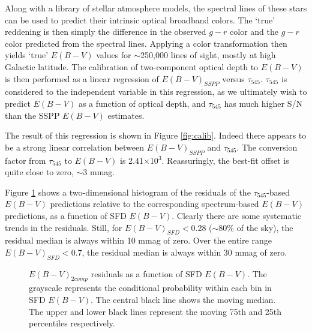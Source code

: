 \documentclass{emulateapj}
\begin{document}
Along with a library of stellar atmosphere models, the spectral lines of these
stars can be used to predict their intrinsic optical broadband colors. The 
`true' reddening is then simply the difference in the observed $g-r$ color and
the $g-r$ color predicted from the spectral lines. Applying a 
color transformation then yields `true' $E(B-V)$ values for $\sim$250,000 lines
of sight, mostly at high Galactic latitude. The calibration of two-component 
optical depth to $E(B-V)$ is then performed as a linear regression of 
$E(B-V)_{SSPP}$ versus $\tau_{545}$. $\tau_{545}$ is considered to the 
independent variable in this regression, as we ultimately wish to predict 
$E(B-V)$ as a function of optical depth, and $\tau_{545}$ has much higher S/N 
than the SSPP $E(B-V)$ estimates. 

The result of this regression is shown in Figure \ref{fig:calib}. Indeed there 
appears to be a strong linear correlation between $E(B-V)_{SSPP}$ 
and $\tau_{545}$. The conversion factor from $\tau_{545}$ to $E(B-V)$ is 
2.41$\times$10$^{3}$. Reassuringly, the best-fit offset is quite close to 
zero, $\sim$3 mmag.

Figure \ref{fig:resid} shows a two-dimensional histogram of the residuals of
the $\tau_{545}$-based $E(B-V)$ predictions relative to the corresponding
spectrum-based $E(B-V)$ predictions, as a function of SFD $E(B-V)$. Clearly 
there are some systematic trends in the residuals. Still, for 
$E(B-V)_{SFD}$$<$0.28 ($\sim$80\% of the sky), the residual median is always 
within 10 mmag of zero. Over the entire range $E(B-V)_{SFD}$$<$0.7, the 
residual median is always within 30 mmag of zero.

\begin{figure}
\begin{center}
\caption{\label{fig:resid} $E(B-V)_{2comp}$ residuals as a function of
SFD $E(B-V)$. The grayscale represents the conditional probability within each
bin in SFD $E(B-V)$. The central black line shows the moving median. The upper
and lower black lines represent the moving 75th and 25th percentiles 
respectively.}
\end{center}
\end{figure}


\end{document}
